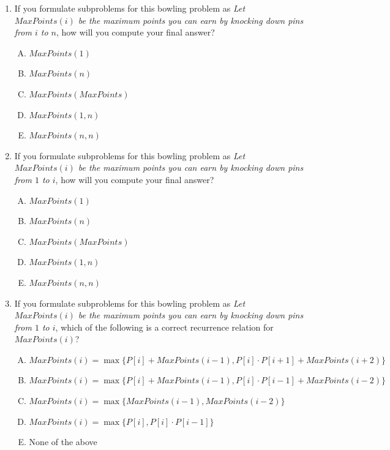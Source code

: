 \documentclass[11pt]{article}
\begin{document}
\begin{enumerate}
You want to maximize your score by choosing which pins to knock down.

For example, if you have 4 pins with values $P=[2,3,5,1]$, one optimal strategy is to knock down pin 1 alone,
pins 2 and 3 together, and pin 4 alone, earning $2 + (3 \cdot 5) + 1 = 18$ points.

\item If you formulate subproblems for this bowling problem as \emph{Let $MaxPoints(i)$
be the maximum points you can earn by knocking down pins from $i$ to $n$},
how will you compute your final answer?
\begin{enumerate}[A.]
    \item $MaxPoints(1)$
    \item $MaxPoints(n)$
    \item $MaxPoints(MaxPoints)$
    \item $MaxPoints(1,n)$
    \item $MaxPoints(n,n)$
\end{enumerate}

\item If you formulate subproblems for this bowling problem as \emph{Let $MaxPoints(i)$
be the maximum points you can earn by knocking down pins from $1$ to $i$},
how will you compute your final answer?
\begin{enumerate}[A.]
    \item $MaxPoints(1)$
    \item $MaxPoints(n)$
    \item $MaxPoints(MaxPoints)$
    \item $MaxPoints(1,n)$
    \item $MaxPoints(n,n)$
\end{enumerate}

\item If you formulate subproblems for this bowling problem as \emph{Let $MaxPoints(i)$
be the maximum points you can earn by knocking down pins from $1$ to $i$},
which of the following is a correct recurrence relation for $MaxPoints(i)$?
\begin{enumerate}[A.]
    \item $MaxPoints(i) = \max \{ P[i] + MaxPoints(i-1), P[i] \cdot P[i+1] + MaxPoints(i+2) \}$
    \item $MaxPoints(i) = \max \{ P[i] + MaxPoints(i-1), P[i] \cdot P[i-1] + MaxPoints(i-2) \}$
    \item $MaxPoints(i) = \max \{ MaxPoints(i-1), MaxPoints(i-2) \}$
    \item $MaxPoints(i) = \max \{ P[i], P[i] \cdot P[i-1] \}$
    \item None of the above

\end{enumerate}
\end{enumerate}
\end{document}
